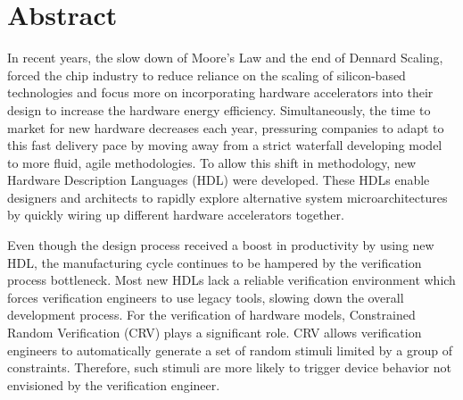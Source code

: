 



\chapter{Abstract}
In recent years, the slow down of Moore's Law and the end of Dennard Scaling,
forced the chip industry to reduce reliance on the scaling of silicon-based
technologies and focus more on incorporating hardware accelerators into their
design to increase the hardware energy efficiency. Simultaneously, the time to
market for new hardware decreases each year, pressuring companies to adapt to
this fast delivery pace by moving away from a strict waterfall developing model
to more fluid, agile methodologies. To allow this shift in methodology, new
Hardware Description Languages (HDL) were developed. These HDLs enable designers
and architects to rapidly explore alternative system microarchitectures by
quickly wiring up different hardware accelerators together.

Even though the design process received a boost in productivity by using new
HDL, the manufacturing cycle continues to be hampered by the verification
process bottleneck. Most new HDLs lack a reliable verification environment which
forces verification engineers to use legacy tools, slowing down the overall
development process. For the verification of hardware models, Constrained Random
Verification (CRV) plays a significant role. CRV allows verification engineers
to automatically generate a set of random stimuli limited by a group of
constraints. Therefore, such stimuli are more likely to trigger device behavior
not envisioned by the verification engineer.

